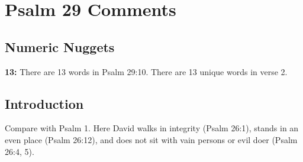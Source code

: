 \section{Psalm 29 Comments}

\subsection{Numeric Nuggets}
\textbf{13:} There are 13 words in Psalm 29:10. There are 13 unique words in verse 2.

\subsection{Introduction}
Compare with Psalm 1. Here David walks in integrity (Psalm 26:1), stands in an even place (Psalm 26:12), and does not sit with vain persons or evil doer (Psalm 26:4, 5).

